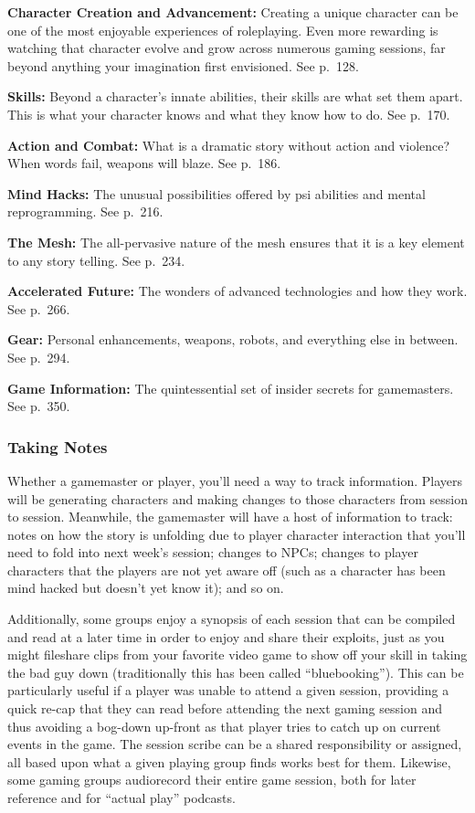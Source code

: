 \textbf{Character Creation and Advancement:} Creating a 
unique character can be one of the most enjoyable 
experiences of roleplaying. Even more rewarding is 
watching that character evolve and grow across numerous gaming sessions, far beyond anything your 
imagination first envisioned. See p. 128.

\textbf{Skills:} Beyond a character's innate abilities, their 
skills are what set them apart. This is what your 
character knows and what they know how to do. See 
p. 170.

\textbf{Action and Combat:} What is a dramatic story without action and violence? When words fail, weapons 
will blaze. See p. 186.

\textbf{Mind Hacks: }The unusual possibilities offered by 
psi abilities and mental reprogramming. See p. 216.

\textbf{The Mesh: }The all-pervasive nature of the mesh 
ensures that it is a key element to any story telling. 
See p. 234.

\textbf{Accelerated Future:} The wonders of advanced technologies and how they work. See p. 266.

\textbf{Gear:} Personal enhancements, weapons, robots, and 
everything else in between. See p. 294.

\textbf{Game Information:} The quintessential set of insider 
secrets for gamemasters. See p. 350.

\subsubsection{Taking Notes}

Whether a gamemaster or player, you'll need a way to 
track information. Players will be generating characters and making changes to those characters from session to session. Meanwhile, the gamemaster will have 
a host of information to track: notes on how the story 
is unfolding due to player character interaction that 
you'll need to fold into next week's session; changes 
to NPCs; changes to player characters that the players 
are not yet aware off (such as a character has been 
mind hacked but doesn't yet know it); and so on.

Additionally, some groups enjoy a synopsis of 
each session that can be compiled and read at a 
later time in order to enjoy and share their exploits, 
just as you might fileshare clips from your favorite 
video game to show off your skill in taking the 
bad guy down (traditionally this has been called 
``bluebooking''). This can be particularly useful if a 
player was unable to attend a given session, providing a quick re-cap that they can read before attending the next gaming session and thus avoiding 
a bog-down up-front as that player tries to catch 
up on current events in the game. The session scribe 
can be a shared responsibility or assigned, all based 
upon what a given playing group finds works best 
for them. Likewise, some gaming groups audiorecord their entire game session, both for later 
reference and for ``actual play'' podcasts.

